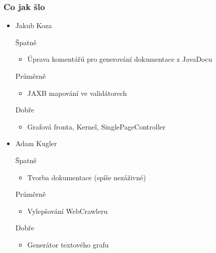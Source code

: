 \documentclass{beamer}
\begin{document}
\begin{frame}[allowframebreaks]\frametitle{Co jak šlo}
  \begin{itemize}
    \item Jakub Koza
     \begin{block}{Špatně} %
       \begin{itemize}
        \item Úprava komentářů pro generování dokumentace z JavaDocu
       \end{itemize}
     \end{block}
     \begin{block}{Průměrně} %
        \begin{itemize}
        \item JAXB mapování ve validátorech
       \end{itemize}
     \end{block}
     \begin{block}{Dobře} %
       \begin{itemize}
        \item Grafová fronta, Kernel, SinglePageController
       \end{itemize}
     \end{block}
   
    \item Adam Kugler
      \begin{block}{Špatně} %
       \begin{itemize}
        \item Tvorba dokumentace (spíše nezáživné)
       \end{itemize}
     \end{block}
     \begin{block}{Průměrně} %
        \begin{itemize}
        \item Vylepšování WebCrawleru
       \end{itemize}
     \end{block}
     \begin{block}{Dobře} %
       \begin{itemize}
        \item Generátor textového grafu
       \end{itemize}
     \end{block}
  

\end{itemize}
\end{frame}
\end{document}
